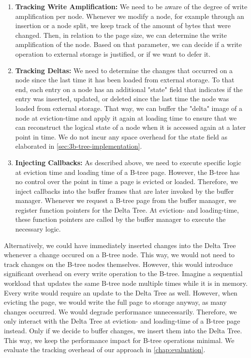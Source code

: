 \begin{enumerate}
  \item \textbf{Tracking Write Amplification:}
We need to be aware of the degree of write amplification per node. 
Whenever we modify a node, for example through an insertion or a node split, we keep track of the amount of bytes that were changed.
Then, in relation to the page size, we can determine the write amplification of the node.
Based on that parameter, we can decide if a write operation to external storage is justified, or if we want to defer it.
  \item \textbf{Tracking Deltas:} 
We need to determine the changes that occurred on a node since the last time it has been loaded from external storage.
To that end, each entry on a node has an additional "state" field that indicates if the entry was inserted, updated, or deleted since the last time the node was loaded from external storage.
That way, we can buffer the "delta" image of a node at eviction-time and apply it again at loading time to ensure that we can reconstruct the logical state of a node when it is accessed again at a later point in time.
We do not incur any space overhead for the state field as elaborated in \autoref{sec:3b-tree-implementation}.
  \item \textbf{Injecting Callbacks:}
As described above, we need to execute specific logic at eviction time and loading time of a B-tree page.
However, the B-tree has no control over the point in time a page is evicted or loaded.
Therefore, we inject callbacks into the buffer frames that are later invoked by the buffer manager.
Whenever we request a B-tree page from the buffer manager, we register function pointers for the Delta Tree.
At eviction- and loading-time, these function pointers are called by the buffer manager to execute the necessary logic.
\end{enumerate}

Alternatively, we could have immediately inserted changes into the Delta Tree whenever a change occured on a B-tree node.
This way, we would not need to track changes on the B-tree nodes themselves.
However, this would introduce significant overhead on every write operation to the B-tree.
Imagine a sequential workload that updates the same B-tree node multiple times while it is in memory.
Every write would require an update to the Delta Tree as well.
However, when evicting the page, we would write the full page to storage anyway, as many changes occurred.
We would degrade performance unnecessarily.
Therefore, we only interact with the Delta Tree at eviction- and loading-time of a B-tree page instead.
Only if we decide to buffer changes, we insert them into the Delta Tree.
This way, we keep the performance impact for B-tree operations minimal.
We evaluate the tracking overhead of our approach in \autoref{chap:evaluation}.

